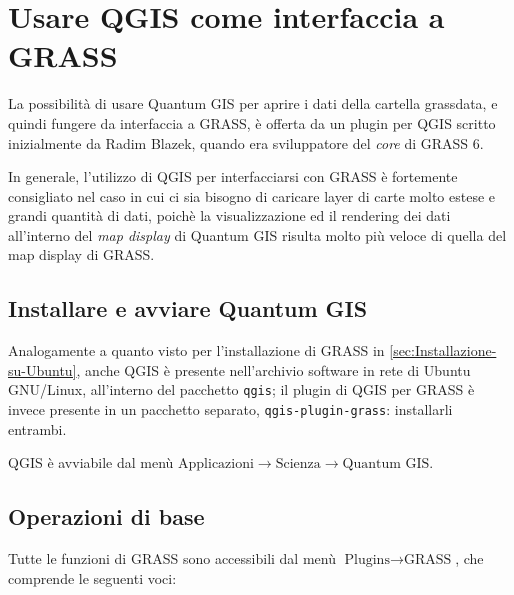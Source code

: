 \chapter{\label{cha:Usare-QGIS-come}Usare QGIS come interfaccia a GRASS}

La possibilità di usare Quantum GIS per aprire i dati della cartella grassdata, e quindi fungere da interfaccia a GRASS, è offerta da un plugin per QGIS scritto inizialmente da Radim Blazek, quando era sviluppatore del \emph{core} di GRASS 6.

In generale, l'utilizzo di QGIS per interfacciarsi con GRASS è fortemente consigliato nel caso in cui ci sia bisogno di caricare layer di carte molto estese e grandi quantità di dati, poichè la visualizzazione ed il rendering dei dati all'interno del \emph{map display} di Quantum GIS risulta molto più veloce di quella del map display di GRASS.

\section{Installare e avviare Quantum GIS}

	Analogamente a quanto visto per l'installazione di GRASS in \textsection\ref{sec:Installazione-su-Ubuntu}, anche QGIS è presente nell'archivio software in rete di Ubuntu GNU/Linux, all'interno del pacchetto \texttt{qgis}; il plugin di QGIS per GRASS è invece presente in un pacchetto separato, \texttt{qgis-plugin-grass}: installarli entrambi.

	QGIS è avviabile dal menù \textsf{$\text{Applicazioni}\rightarrow\text{Scienza}\rightarrow\text{Quantum~GIS}$}.


\section{Operazioni di base}
	Tutte le funzioni di GRASS sono accessibili dal menù \textsf{$\text{Plugins}\rightarrow\text{GRASS}$}, che comprende le seguenti voci:

